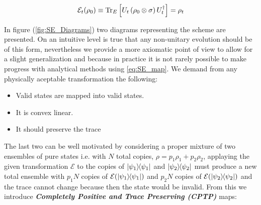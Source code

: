 \begin{equation} \label{eq:SE_map}
 \mathcal{E}_{t}(\rho_{0}) \equiv \mathrm{Tr}_{E}\left[U_{t}\left(\rho_{0}\otimes \sigma\right)U_{t}^{\dagger}\right] = \rho_{t}
\end{equation}

In figure (\ref{fig:SE_Diagrams}) two diagrams representing  the scheme are presented. On an intuitive level is true that any non-unitary
evolution should be of this form, nevertheless we provide a more axiomatic point of view to allow for a slight generalization and because in
practice it is not rarely possible to make progress with analytical methods using \eqref{eq:SE_map}. We demand from any physically aceptable
transformation the following:

\begin{itemize}
  \item Valid states are mapped into valid states.
  \item It is convex linear.
  \item  It should preserve the trace
\end{itemize}
The last two can be well motivated by considering a proper mixture of two ensembles of pure states i.e. with $N$ total copies, $\rho =
p_{1}\rho_{1} + p_{2}\rho_{2}$, applaying the given transformation $\mathcal{E}$ to the copies of  $\ketbra{\psi_{1}}$ and $\ketbra{\psi_{2}}$  must produce a new total ensemble with $p_{1}N$ copies of $\mathcal{E}(\ketbra{\psi_{1}})$ and $p_{2}N$ copies of
$\mathcal{E}(\ketbra{\psi_{2}})$ and the trace cannot change because then the state would be invalid. From this we introduce
\textit{\textbf{Completely Positive and Trace Preserving (CPTP)}} maps:

